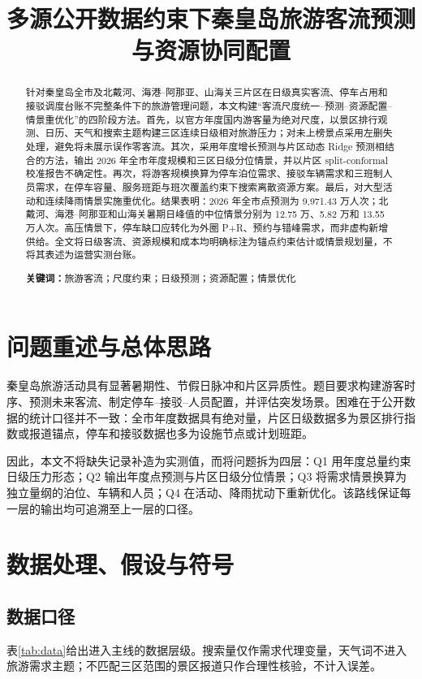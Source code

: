\documentclass[UTF8,12pt,a4paper]{ctexart}
\title{多源公开数据约束下秦皇岛旅游客流预测与资源协同配置}
\author{}
\date{}
\begin{document}
\maketitle

\begin{abstract}
针对秦皇岛全市及北戴河、海港--阿那亚、山海关三片区在日级真实客流、停车占用和接驳调度台账不完整条件下的旅游管理问题，本文构建``客流尺度统一--预测--资源配置--情景重优化''的四阶段方法。首先，以官方年度国内游客量为绝对尺度，以景区排行观测、日历、天气和搜索主题构建三区连续日级相对旅游压力；对未上榜景点采用左删失处理，避免将未展示误作零客流。其次，采用年度增长预测与片区动态 Ridge 预测相结合的方法，输出 2026 年全市年度规模和三区日级分位情景，并以片区 split-conformal 校准报告不确定性。再次，将游客规模换算为停车泊位需求、接驳车辆需求和三班制人员需求，在停车容量、服务班距与班次覆盖约束下搜索离散资源方案。最后，对大型活动和连续降雨情景实施重优化。结果表明：2026 年全市点预测为 9,971.43 万人次；北戴河、海港--阿那亚和山海关暑期日峰值的中位情景分别为 12.75 万、5.82 万和 13.55 万人次。高压情景下，停车缺口应转化为外圈 P+R、预约与错峰需求，而非虚构新增供给。全文将日级客流、资源规模和成本均明确标注为锚点约束估计或情景规划量，不将其表述为运营实测台账。

\noindent\textbf{关键词：}旅游客流；尺度约束；日级预测；资源配置；情景优化
\end{abstract}

\section{问题重述与总体思路}
秦皇岛旅游活动具有显著暑期性、节假日脉冲和片区异质性。题目要求构建游客时序、预测未来客流、制定停车--接驳--人员配置，并评估突发场景。困难在于公开数据的统计口径并不一致：全市年度数据具有绝对量，片区日级数据多为景区排行指数或报道锚点，停车和接驳数据也多为设施节点或计划班距。

因此，本文不将缺失记录补造为实测值，而将问题拆为四层：Q1 用年度总量约束日级压力形态；Q2 输出年度点预测与片区日级分位情景；Q3 将需求情景换算为独立量纲的泊位、车辆和人员；Q4 在活动、降雨扰动下重新优化。该路线保证每一层的输出均可追溯至上一层的口径。

\section{数据处理、假设与符号}
\subsection{数据口径}
表\ref{tab:data}给出进入主线的数据层级。搜索量仅作需求代理变量，天气词不进入旅游需求主题；不匹配三区范围的景区报道只作合理性核验，不计入误差。
\end{document}
